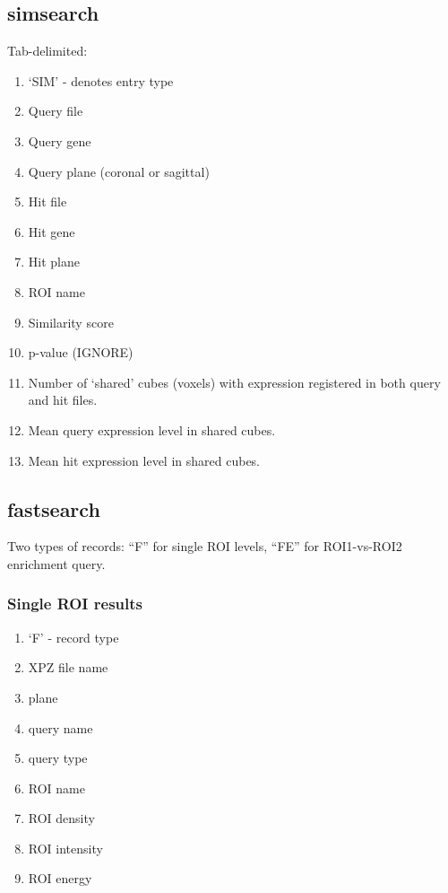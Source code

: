 \documentclass[10pt]{article}
\begin{document}
\subsection{simsearch}
Tab-delimited:
\begin{enumerate}
\item `SIM' - denotes entry type
\item Query file
\item Query gene
\item Query plane (coronal or sagittal)
\item Hit file 
\item Hit gene
\item Hit plane
\item ROI name
\item Similarity score
\item p-value (IGNORE)
\item Number of `shared' cubes (voxels) with expression registered in both query and hit files.
\item Mean query expression level in shared cubes.
\item Mean hit expression level in shared cubes.
\end{enumerate}


\subsection{fastsearch}

Two types of records: ``F'' for single ROI levels, ``FE'' for ROI1-vs-ROI2 enrichment query.


\subsubsection{Single ROI results}
\begin{enumerate}
\item `F' - record type
\item XPZ file name
\item plane
\item query name
\item query type
\item ROI name
\item ROI density
\item ROI intensity
\item ROI energy
\end{enumerate}
\end{document}
